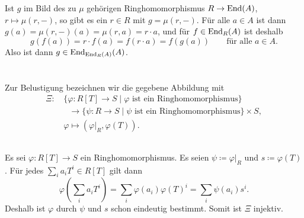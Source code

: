 \documentclass[a4paper, 10pt, numbers=noenddot]{scrartcl}
\begin{document}
Ist $g$ im Bild des zu $\mu$ gehörigen Ringhomomorphismus $R \to \operatorname{End}(A)$, $r \mapsto \mu(r, -)$, so gibt es ein $r \in R$ mit $g = \mu(r, -)$.
Für alle $a \in A$ ist dann $g(a) = \mu(r,-)(a) = \mu(r,a) = r \cdot a$, und für $f \in \operatorname{End}_R(A)$ ist deshalb
\[
    g(f(a))
  = r \cdot f(a)
  = f(r \cdot a)
  = f(g(a))
  \qquad
  \text{für alle $a \in A$}.
\]
Also ist dann $g \in \operatorname{End}_{\operatorname{End}_R(A)}(A)$.




















\section{}

Zur Belustigung bezeichnen wir die gegebene Abbildung mit
\begin{align*}
              \Xi
  \colon&\,   \{ \varphi  \colon R[T] \to S \mid \text{$\varphi$ ist ein Ringhomomorphismus} \}
  \\
        &\,   \phantom{\varphi} \to \{ \psi \colon R \to S        \mid \text{$\psi$ ist ein Ringhomomorphismus} \}
                                    \times S,
  \\
         &\,  \varphi
  \mapsto     (\varphi|_R, \varphi(T)).
\end{align*}





\subsection{}

Es sei $\varphi \colon R[T] \to S$ ein Ringhomomorphismus.
Es seien $\psi \coloneqq \varphi|_R$ und $s \coloneqq \varphi(T)$.
Für jedes $\sum_i a_i T^i \in R[T]$ gilt dann
\[
    \varphi\left( \sum_i a_i T^i \right)
  = \sum_i \varphi(a_i) \varphi(T)^i
  = \sum_i \psi(a_i) s^i.
\]
Deshalb ist $\varphi$ durch $\psi$ und $s$ schon eindeutig bestimmt.
Somit ist $\Xi$ injektiv.





\subsection{}
\end{document}
